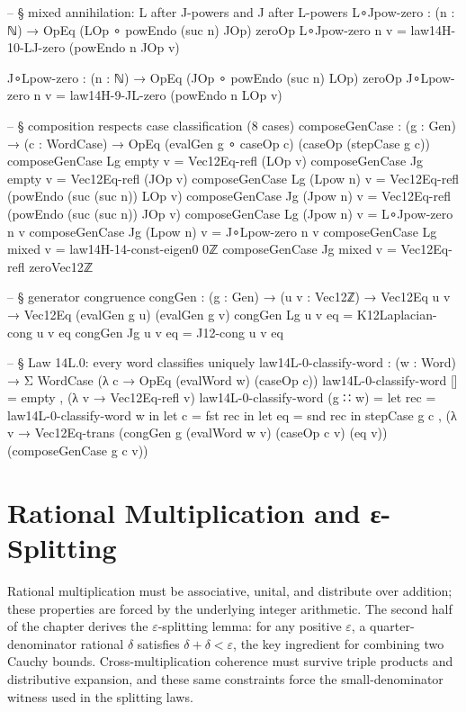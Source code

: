 \documentclass[11pt,a4paper]{book}
\def\texorpdfstring#1#2{#2}%
\begin{document}
\begin{code}
-- § mixed annihilation: L after J-powers and J after L-powers
L∘Jpow-zero : (n : ℕ) → OpEq (LOp ∘ powEndo (suc n) JOp) zeroOp
L∘Jpow-zero n v = law14H-10-LJ-zero (powEndo n JOp v)

J∘Lpow-zero : (n : ℕ) → OpEq (JOp ∘ powEndo (suc n) LOp) zeroOp
J∘Lpow-zero n v = law14H-9-JL-zero (powEndo n LOp v)

-- § composition respects case classification (8 cases)
composeGenCase : (g : Gen) → (c : WordCase) → OpEq (evalGen g ∘ caseOp c) (caseOp (stepCase g c))
composeGenCase Lg empty v = Vec12Eq-refl (LOp v)
composeGenCase Jg empty v = Vec12Eq-refl (JOp v)
composeGenCase Lg (Lpow n) v = Vec12Eq-refl (powEndo (suc (suc n)) LOp v)
composeGenCase Jg (Jpow n) v = Vec12Eq-refl (powEndo (suc (suc n)) JOp v)
composeGenCase Lg (Jpow n) v = L∘Jpow-zero n v
composeGenCase Jg (Lpow n) v = J∘Lpow-zero n v
composeGenCase Lg mixed v = law14H-14-const-eigen0 0ℤ
composeGenCase Jg mixed v = Vec12Eq-refl zeroVec12ℤ

-- § generator congruence
congGen : (g : Gen) → (u v : Vec12ℤ) → Vec12Eq u v → Vec12Eq (evalGen g u) (evalGen g v)
congGen Lg u v eq = K12Laplacian-cong u v eq
congGen Jg u v eq = J12-cong u v eq

-- § Law 14L.0: every word classifies uniquely
law14L-0-classify-word : (w : Word) → Σ WordCase (λ c → OpEq (evalWord w) (caseOp c))
law14L-0-classify-word [] = empty , (λ v → Vec12Eq-refl v)
law14L-0-classify-word (g ∷ w) =
  let rec = law14L-0-classify-word w in
  let c   = fst rec in
  let eq  = snd rec in
  stepCase g c ,
  (λ v →
    Vec12Eq-trans
      (congGen g (evalWord w v) (caseOp c v) (eq v))
      (composeGenCase g c v))
\end{code}


\chapter{Rational Multiplication and \texorpdfstring{$\varepsilon$}{ε}-Splitting}
\label{ch:rat-mul-epsilon}

Rational multiplication must be associative, unital, and distribute over
addition; these properties are forced by the underlying integer arithmetic.
The second half of the chapter derives the $\varepsilon$-splitting lemma:
for any positive $\varepsilon$, a quarter-denominator rational $\delta$
satisfies $\delta + \delta < \varepsilon$, the key ingredient for combining
two Cauchy bounds.  Cross-multiplication coherence must survive triple
products and distributive expansion, and these same constraints force the
small-denominator witness used in the splitting laws.
\end{document}

